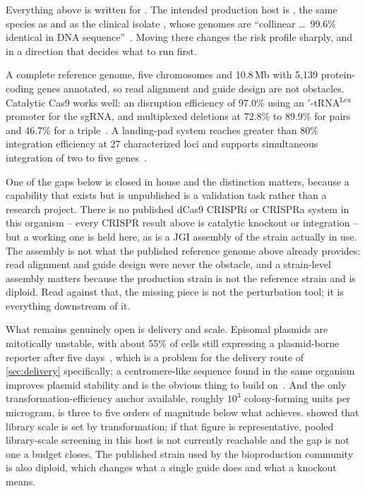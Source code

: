 Everything above is written for . The intended production
host is , the same species as  and as the clinical isolate , whose genomes are
``collinear \dots\ 99.6\% identical in DNA
sequence''~\citep{douglassPopulationGenomicsCandida2018}. Moving there changes
the risk profile sharply, and in a direction that decides what to run first.

 A complete reference genome, five chromosomes and
10.8\,Mb with 5{,}139 protein-coding genes annotated, so read alignment and
guide design are not obstacles. Catalytic Cas9 works well: an 
disruption efficiency of 97.0\% using an $'$-tRNA$^{\text{Leu}}$
promoter for the sgRNA, and multiplexed deletions at 72.8\% to 89.9\% for pairs
and 46.7\% for a triple~\citep{tranDevelopmentCRISPRCas9Based2019}. A landing-pad
system reaches greater than 80\% integration efficiency at 27 characterized loci
and supports simultaneous integration of two to five
genes~\citep{fatmaLandingPadSystem2023}.

One of the gaps below is closed in house and the distinction matters, because a
capability that exists but is unpublished is a validation task rather than a
research project. There is no published dCas9 CRISPRi or CRISPRa system in this
organism -- every CRISPR result above is catalytic knockout or integration --
but a working one is held here, as is a JGI
assembly of the strain actually in use. The
assembly is not what the published reference genome above already provides: read
alignment and guide design were never the obstacle, and a strain-level assembly
matters because the production strain is not the reference strain and is diploid.
Read against that, the missing piece is not the perturbation tool; it is
everything downstream of it.

What remains genuinely open is delivery and scale. Episomal plasmids are
mitotically unstable, with about 55\% of cells still expressing a plasmid-borne
reporter after five days~\citep{tranDevelopmentCRISPRCas9Based2019}, which is a
problem for the delivery route of \cref{sec:delivery} specifically; a
centromere-like sequence found in the same organism improves plasmid stability
and is the obvious thing to build
on~\citep{caoGeneticToolboxMetabolic2020}. And the only
transformation-efficiency anchor available, roughly $10^{3}$ colony-forming
units per microgram, is three to five orders of magnitude below what
 achieves.  showed that library
scale is set by transformation; if that figure is representative, pooled
library-scale screening in this host is not currently reachable and the gap is
not one a budget closes. The published strain used by the bioproduction
community is also diploid, which changes what a single guide does and what a
knockout means.

